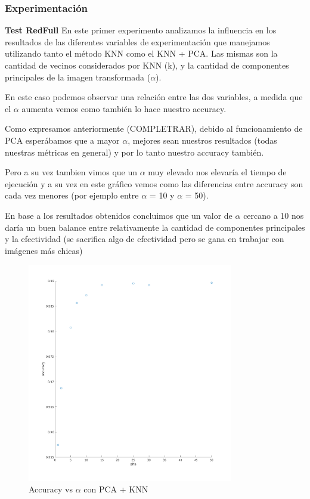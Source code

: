\subsubsection*{Experimentación}
\textbf{Test RedFull}
En este primer experimento analizamos la influencia en los resultados de las diferentes variables de experimentación que manejamos utilizando tanto el método KNN como el KNN + PCA. Las mismas son la cantidad de vecinos considerados por KNN (k), y la cantidad de componentes principales de la imagen transformada ($\alpha$).


En este caso podemos observar una relación entre las dos variables, a medida que el $\alpha$ aumenta vemos como también lo hace nuestro accuracy.

Como expresamos anteriormente (COMPLETRAR), debido al funcionamiento de PCA esperábamos que a mayor $\alpha$, mejores sean nuestros resultados (todas nuestras métricas en general) y por lo tanto nuestro accuracy también.

Pero a su vez tambien vimos que un $\alpha$ muy elevado  nos elevaría el tiempo de ejecución y a su vez en este gráfico vemos como las diferencias entre accuracy son cada vez menores (por ejemplo entre $\alpha$ = 10 y $\alpha$ = 50).

En base a los resultados obtenidos concluimos que un valor de $\alpha$ cercano a 10 nos daría un buen balance entre relativamente la cantidad de componentes principales y la efectividad (se sacrifica algo de efectividad pero se gana en trabajar con imágenes más chicas)

\begin{figure}[H]
	\centering	\includegraphics[width=0.8\textwidth]{img/alfa_pca_accu.png}
	\caption{Accuracy vs $\alpha$ con PCA + KNN}
	\label{fig:Accuracy vs Alpha con KNN + PCA}
\end{figure}

